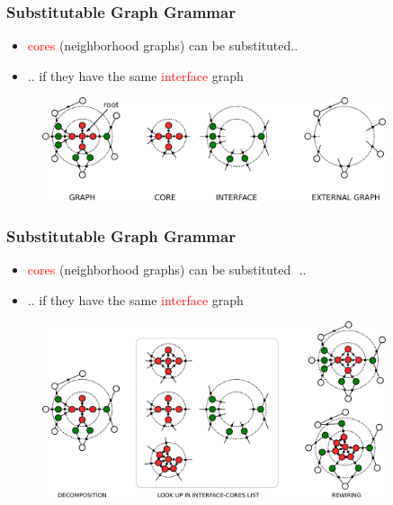 \documentclass{beamer}
\newcommand{\red}[1]{\textcolor{red}{#1}}
\begin{document}
\begin{frame}
    \frametitle{Substitutable Graph Grammar}
    \begin{itemize}
        \item \red{cores} (neighborhood graphs) can be substituted..
        \item .. if they have the same \red{interface} graph
    \end{itemize}
    \begin{figure}[ht]
        \centering
        \includegraphics[width=0.9\textwidth]{images/cip1.pdf}
    \end{figure}
\end{frame}

\begin{frame}
    \frametitle{Substitutable Graph Grammar}
    \begin{itemize}
        \item \red{cores} (neighborhood graphs) can be substituted  ..
        \item .. if they have the same \red{interface} graph
    \end{itemize}
    \begin{figure}[ht]
        \centering
        \includegraphics[width=0.9\textwidth]{images/cip2.pdf}
    \end{figure}
\end{frame}



\end{document}
